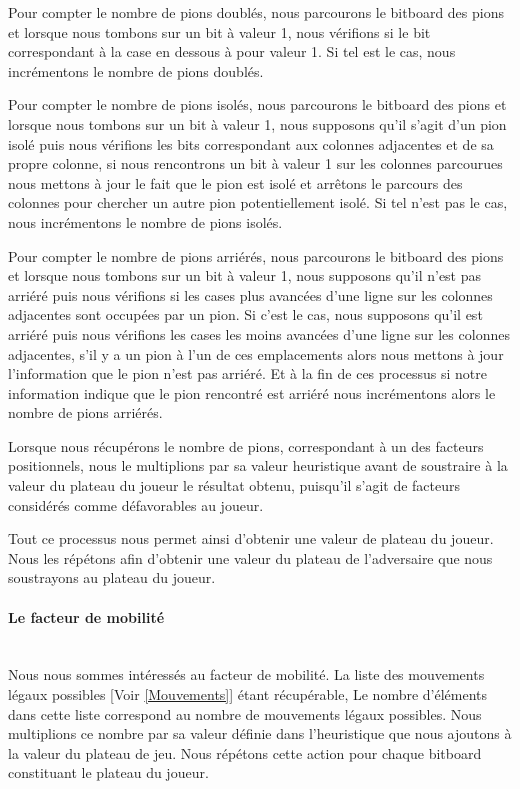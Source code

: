 \huge\documentclass{article}
\begin{document}
Pour compter le nombre de pions doublés, nous parcourons le bitboard des pions et lorsque nous tombons sur un bit à valeur 1, nous vérifions si le bit correspondant à la case en dessous à pour valeur 1.\newline
Si tel est le cas, nous incrémentons le nombre de pions doublés.\newline

Pour compter le nombre de pions isolés, nous parcourons le bitboard des pions et lorsque nous tombons sur un bit à valeur 1, nous supposons qu'il s'agit d'un pion isolé puis nous vérifions les bits correspondant aux colonnes adjacentes et de sa propre colonne, si nous rencontrons un bit à valeur 1 sur les colonnes parcourues nous mettons à jour le fait que le pion est isolé et arrêtons le parcours des colonnes pour chercher un autre pion potentiellement isolé. Si tel n'est pas le cas, nous incrémentons le nombre de pions isolés.\newline

Pour compter le nombre de pions arriérés, nous parcourons le bitboard des pions et lorsque nous tombons sur un bit à valeur 1, nous supposons qu'il n'est pas arriéré puis nous vérifions si les cases plus avancées d'une ligne sur les colonnes adjacentes sont occupées par un pion. Si c'est le cas, nous supposons qu'il est arriéré puis nous vérifions les cases les moins avancées d'une ligne sur les colonnes adjacentes, s'il y a un pion à l'un de ces emplacements alors nous mettons à jour l'information que le pion n'est pas arriéré. Et à la fin de ces processus si notre information indique que le pion rencontré est arriéré nous incrémentons alors le nombre de pions arriérés.

Lorsque nous récupérons le nombre de pions, correspondant à un des facteurs positionnels, nous le multiplions par sa valeur heuristique avant de soustraire à la valeur du plateau du joueur le résultat obtenu, puisqu'il s'agit de facteurs considérés comme défavorables au joueur.
\newline

Tout ce processus nous permet ainsi d'obtenir une valeur de plateau du joueur. Nous les répétons afin d'obtenir une valeur du plateau de l'adversaire que nous soustrayons au plateau du joueur.

\paragraph{Le facteur de mobilité}
~~\\
\newline
Nous nous sommes intéressés au facteur de mobilité.\newline
La liste des mouvements légaux possibles [Voir \ref{Mouvements}] étant récupérable,
Le nombre d'éléments dans cette liste correspond au nombre de mouvements légaux possibles.
Nous multiplions ce nombre par sa valeur définie dans l'heuristique que nous ajoutons à la valeur du plateau de jeu.\newline
Nous répétons cette action pour chaque bitboard constituant le plateau du joueur.
\end{document}
